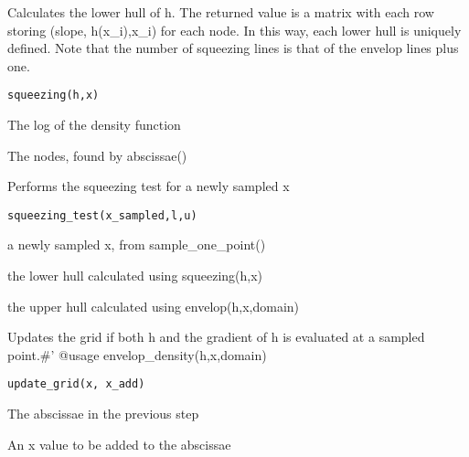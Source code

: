 \documentclass[a4paper]{book}
\begin{document}
%
\begin{Description}\relax
Calculates the lower hull of h. The returned value is a matrix with each row storing (slope, h(x\_i),x\_i) for each node. In this way, each lower hull is uniquely defined. Note that the number of squeezing lines is that of the envelop lines plus one.
\end{Description}
%
\begin{Usage}
\begin{verbatim}
squeezing(h,x)
\end{verbatim}
\end{Usage}
%
\begin{Arguments}
\begin{ldescription}
\item[\code{h}] The log of the density function

\item[\code{x}] The nodes, found by abscissae()
\end{ldescription}
\end{Arguments}
%
\begin{Description}\relax
Performs the squeezing test for a newly sampled x
\end{Description}
%
\begin{Usage}
\begin{verbatim}
squeezing_test(x_sampled,l,u)
\end{verbatim}
\end{Usage}
%
\begin{Arguments}
\begin{ldescription}
\item[\code{x\_sampled}] a newly sampled x, from sample\_one\_point()

\item[\code{l}] the lower hull calculated using squeezing(h,x)

\item[\code{u}] the upper hull calculated using envelop(h,x,domain)
\end{ldescription}
\end{Arguments}
%
\begin{Description}\relax
Updates the grid if both h and the gradient of h is evaluated at a sampled point.\#' @usage envelop\_density(h,x,domain)
\end{Description}
%
\begin{Usage}
\begin{verbatim}
update_grid(x, x_add)
\end{verbatim}
\end{Usage}
%
\begin{Arguments}
\begin{ldescription}
\item[\code{x}] The abscissae in the previous step

\item[\code{x\_add}] An x value to be added to the abscissae
\end{ldescription}
\end{Arguments}
\printindex{}
\end{document}
